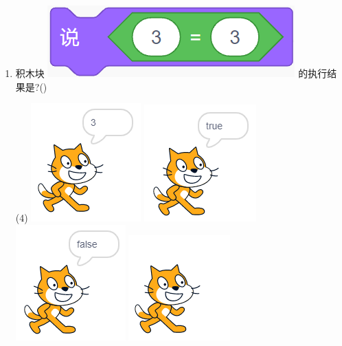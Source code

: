 \documentclass[10pt, a4paper]{article}
\begin{document}
\begin{enumerate}
        \item 积木块 \includegraphics[width=.15\textwidth]{19.png} 的执行结果是?(\qquad)
        \begin{tasks}(4)
            \task \includegraphics[width=.12\textwidth]{19a.png}
            \task \includegraphics[width=.12\textwidth]{19b.png}
            \task \includegraphics[width=.12\textwidth]{19c.png}
            \task \includegraphics[width=.12\textwidth]{19d.png}
        \end{tasks}


\end{enumerate}
\end{document}
